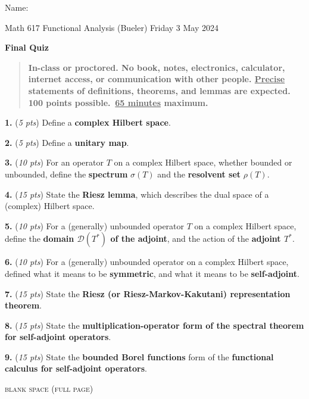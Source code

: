 \documentclass[12pt]{amsart}
\newcommand{\cD}{\mathcal{D}}
\newcommand{\prob}[1]{\bigskip\noindent\textbf{#1.} }
\newcommand{\pts}[1]{(\emph{#1 pts})}
\newcommand{\probpts}[2]{\prob{#1} \pts{#2} \quad}
\begin{document}
\hfill \Large Name:\underline{\phantom{Ed Bueler really really long long long name}}
\medskip

\scriptsize \noindent Math 617 Functional Analysis (Bueler) \hfill Friday 3 May 2024
\medskip

\LARGE\centerline{\textbf{Final Quiz}}

\normalsize
\smallskip
\begin{quote}
\textbf{In-class or proctored.  No book, notes, electronics, calculator, internet access, or communication with other people.  \underline{Precise} statements of definitions, theorems, and lemmas are expected.  100 points possible. \,\underline{65 minutes} maximum.}
\end{quote}

\normalsize
\medskip

\thispagestyle{empty}

\probpts{1}{5}  Define a \textbf{complex Hilbert space}.
\vfill

\probpts{2}{5}  Define a \textbf{unitary map}.
\vfill

\probpts{3}{10}  For an operator $T$ on a complex Hilbert space, whether bounded or unbounded, define the \textbf{spectrum} $\sigma(T)$ and the \textbf{resolvent set} $\rho(T)$. 
\vspace{3.5in}

\clearpage\newpage
\probpts{4}{15}  State the \textbf{Riesz lemma}, which describes the dual space of a (complex) Hilbert space.
\vspace{3.0in}

\probpts{5}{10}  For a (generally) unbounded operator $T$ on a complex Hilbert space, define the \textbf{domain $\cD(T^*)$ of the adjoint}, and the action of the \textbf{adjoint $T^*$}.
\vfill

\clearpage\newpage
\probpts{6}{10}  For a (generally) unbounded operator on a complex Hilbert space, defined what it means to be \textbf{symmetric}, and what it means to be \textbf{self-adjoint}.
\vfill

\probpts{7}{15}  State the \textbf{Riesz (or Riesz-Markov-Kakutani) representation theorem}.
\vfill

\clearpage\newpage
\probpts{8}{15}  State the \textbf{multiplication-operator form of the spectral theorem for self-adjoint operators}.
\vfill

\clearpage\newpage
\probpts{9}{15}  State the \textbf{bounded Borel functions} form of the \textbf{functional calculus for self-adjoint operators}.

\clearpage
\newpage
\thispagestyle{empty}
\begin{center}
\small
\textsc{blank space (full page)}
\end{center}
\vfill
\end{document}
